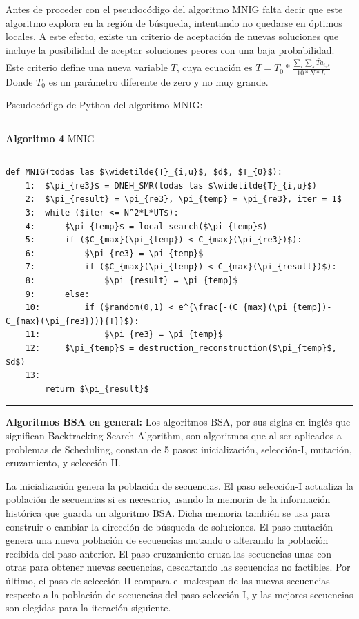 \documentclass{article}
\begin{document}
\vspace{\baselineskip}
Antes de proceder con el pseudocódigo del algoritmo MNIG falta decir que este algoritmo explora en la región de búsqueda, intentando no quedarse en óptimos locales. A este efecto, existe un criterio de aceptación de nuevas soluciones que incluye la posibilidad de aceptar soluciones peores con una baja probabilidad. Este criterio define una nueva variable $T$, cuya ecuación es $T = T_{0}*\frac{\sum_{i}\sum_{s}\widetilde{Ta}_{i,s}}{10*N*L}$ Donde $T_{0}$ es un parámetro diferente de zero y no muy grande. \autocite{algMNIG}

\vspace{\baselineskip}
Pseudocódigo de Python del algoritmo MNIG:

\noindent\noindent
\rule{\linewidth}{0.4pt}

\textbf{Algoritmo 4} MNIG

\noindent\noindent
\rule{\linewidth}{0.4pt}

\begin{lstlisting}[mathescape=true]
    def MNIG(todas las $\widetilde{T}_{i,u}$, $d$, $T_{0}$):
    1:  $\pi_{re3}$ = DNEH_SMR(todas las $\widetilde{T}_{i,u}$)
    2:  $\pi_{result} = \pi_{re3}, \pi_{temp} = \pi_{re3}, iter = 1$
    3:  while ($iter <= N^2*L*UT$):
    4:      $\pi_{temp}$ = local_search($\pi_{temp}$)
    5:      if ($C_{max}(\pi_{temp}) < C_{max}(\pi_{re3})$):
    6:          $\pi_{re3} = \pi_{temp}$
    7:          if ($C_{max}(\pi_{temp}) < C_{max}(\pi_{result})$):
    8:              $\pi_{result} = \pi_{temp}$
    9:      else:
    10:         if ($random(0,1) < e^{\frac{-(C_{max}(\pi_{temp})-C_{max}(\pi_{re3}))}{T}}$):
    11:             $\pi_{re3} = \pi_{temp}$
    12:     $\pi_{temp}$ = destruction_reconstruction($\pi_{temp}$, $d$)
    13:
        return $\pi_{result}$
\end{lstlisting}

\noindent\noindent
\rule{\linewidth}{0.4pt}

\vspace{\baselineskip}
\textbf{Algoritmos BSA en general:} Los algoritmos BSA, por sus siglas en inglés que significan Backtracking Search Algorithm, son algoritmos que al ser aplicados a problemas de Scheduling, constan de 5 pasos: inicialización, selección-I, mutación, cruzamiento, y selección-II. \autocite{modFMMSP}

\vspace{\baselineskip}
La inicialización genera la población de secuencias. El paso selección-I actualiza la población de secuencias si es necesario, usando la memoria de la información histórica que guarda un algoritmo BSA. Dicha memoria también se usa para construir o cambiar la dirección de búsqueda de soluciones. El paso mutación genera una nueva población de secuencias mutando o alterando la población recibida del paso anterior. El paso cruzamiento cruza las secuencias unas con otras para obtener nuevas secuencias, descartando las secuencias no factibles. Por último, el paso de selección-II compara el makespan de las nuevas secuencias respecto a la población de secuencias del paso selección-I, y las mejores secuencias son elegidas para la iteración siguiente. \autocite{modFMMSP}
\end{document}
